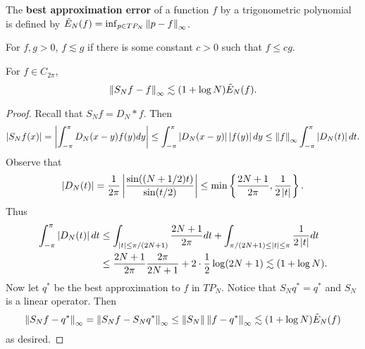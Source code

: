 \begin{definition}
    The \textbf{best approximation error} of a function $f$ by a trigonometric 
    polynomial is defined by $\tilde{E}_N(f) = \inf_{p\in TP_N}\left\lVert {p-f} \right\rVert_\infty$. 
\end{definition}

\begin{definition}
    For $f,g > 0$, $f\lesssim g$ if there is some constant $c>0$ such that $f\leq cg$.
\end{definition}

\begin{theorem}\label{thm:fourier_series_approx_loss}
    For $f\in C_{2\pi}$, 
    \begin{equation*}
        \left\lVert {S_Nf - f} \right\rVert_\infty \lesssim (1+\log N)\tilde{E}_N(f).
    \end{equation*}
\end{theorem}
\begin{proof}
    Recall that $S_Nf = D_N*f$. Then
    \begin{equation*}
        \left\lvert {S_Nf(x)} \right\rvert = \left\lvert {\int_{-\pi}^\pi D_N(x-y)f(y)dy} \right\rvert \leq \int_{-\pi}^\pi \left\lvert {D_N(x-y)} \right\rvert\left\lvert {f(y)} \right\rvert dy
        \leq \left\lVert {f} \right\rVert_\infty\int_{-\pi}^\pi \left\lvert {D_N(t)} \right\rvert dt.
    \end{equation*}
    Observe that 
    \begin{equation*}
        \abs{D_N(t)} = \frac{1}{2\pi}\abs{\frac{\sin\pth{(N+1/2)t}}{\sin(t/2)}} \leq \min\set{\frac{2N+1}{2\pi}, \frac{1}{2\abs{t}}}.
    \end{equation*}
    Thus 
    \begin{equation*}
        \begin{split}
            \int_{-\pi}^{\pi} \left\lvert {D_N(t)} \right\rvert dt &\leq \int_{\left\lvert {t} \right\rvert\leq \pi/(2N+1)} \frac{2N+1}{2\pi}dt + \int_{\pi/(2N+1)\leq\left\lvert {t} \right\rvert\leq\pi} \frac{1}{2\left\lvert {t} \right\rvert}dt \\
            &\leq \frac{2N+1}{2\pi}\frac{2\pi}{2N+1} + 2\cdot\frac{1}{2}\log(2N+1) \lesssim (1 + \log N).
        \end{split}
    \end{equation*}
    Now let $q^*$ be the best approximation to $f$ in $TP_N$. 
    Notice that $S_Nq^* = q^*$ and $S_N$ is a linear operator. Then 
    \begin{equation*}
        \left\lVert {S_Nf - q^*} \right\rVert_\infty = \left\lVert {S_Nf - S_Nq^*} \right\rVert_\infty 
        \leq \left\lVert {S_N} \right\rVert\left\lVert {f-q^*} \right\rVert_\infty \lesssim (1+\log N)\tilde{E}_N(f)
    \end{equation*}
    as desired.
\end{proof}

